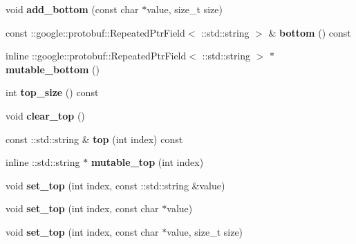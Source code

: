 \begin{DoxyCompactItemize}
void {\bfseries add\+\_\+bottom} (const char $\ast$value, size\+\_\+t size)
\item 
\mbox{\label{classcaffe_1_1_layer_parameter_a035b69515680b681e5e16b459d66f241}} 
const \+::google\+::protobuf\+::\+Repeated\+Ptr\+Field$<$ \+::std\+::string $>$ \& {\bfseries bottom} () const
\item 
\mbox{\label{classcaffe_1_1_layer_parameter_a8da8679855165c117a64d70cb873f823}} 
inline \+::google\+::protobuf\+::\+Repeated\+Ptr\+Field$<$ \+::std\+::string $>$ $\ast$ {\bfseries mutable\+\_\+bottom} ()
\item 
\mbox{\label{classcaffe_1_1_layer_parameter_a8c62d08a0e5cfb7f2505379852eb3e1a}} 
int {\bfseries top\+\_\+size} () const
\item 
\mbox{\label{classcaffe_1_1_layer_parameter_a635d2f5c7625cf48fb65f7d6880c30c6}} 
void {\bfseries clear\+\_\+top} ()
\item 
\mbox{\label{classcaffe_1_1_layer_parameter_a9d724f2c70e3b5ddc39c7f6a39d74324}} 
const \+::std\+::string \& {\bfseries top} (int index) const
\item 
\mbox{\label{classcaffe_1_1_layer_parameter_a4fe0795dbec9b7bd318e9e3efc718a71}} 
inline \+::std\+::string $\ast$ {\bfseries mutable\+\_\+top} (int index)
\item 
\mbox{\label{classcaffe_1_1_layer_parameter_a3befd1b1f1554414f3b1fd1156f8f6af}} 
void {\bfseries set\+\_\+top} (int index, const \+::std\+::string \&value)
\item 
\mbox{\label{classcaffe_1_1_layer_parameter_acf9aafbc2692314c1903e7ad28a66c81}} 
void {\bfseries set\+\_\+top} (int index, const char $\ast$value)
\item 
\mbox{\label{classcaffe_1_1_layer_parameter_a8f61b9f9fa3b59373578eb21d88af698}} 
void {\bfseries set\+\_\+top} (int index, const char $\ast$value, size\+\_\+t size)
\item 

\end{DoxyCompactItemize}
